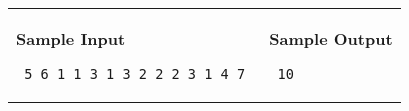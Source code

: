 \documentclass[11pt]{article}
\begin{document}
\vspace{0.25in}\hspace{-0.3in}\begin{tabular}{ll}

\parbox{3in}{{\large\bf Sample Input}

\vspace{0.15in}

{\tt 
5 6 1 1 3 1 3 2 2 2 3 1 4 7
}
}

&

\parbox{3in}{{\large\bf Sample Output}

\vspace{0.15in}

{\tt
10
}
}

\\
\end{tabular}
\end{document}
